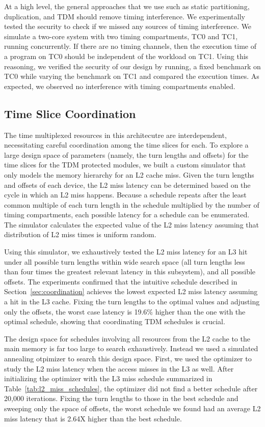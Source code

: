At a high level, the general approaches that we use such as static partitioning,
duplication, and TDM should remove timing interference. We experimentally
tested the security to check if we missed any sources of timing interference.
We simulate a two-core 
system with two timing compartments, TC0 and
TC1, running concurrently. 
If there are no timing channels, then the execution time of a program on 
TC0 should be independent of the workload on TC1.
Using this reasoning, we verified the
security of our design by running, a fixed benchmark
on TC0 while varying the benchmark on TC1 and compared the execution times. 
As expected, 
we observed no interference with timing compartments enabled.

\subsection{Time Slice Coordination}
\label{sec:eval_coord}

The time multiplexed resources in this architecutre are interdependent, 
necessitating careful coordination among the time slices for each.
To explore a large design space of parameters (namely, the turn lengths and 
offsets) for the time slices for the TDM 
protected modules, we built a custom simulator that only models the memory
hierarchy for an L2 cache miss.
Given the turn lengths and offsets of each device, the L2 miss latency can
be determined based on the cycle in which an L2 miss happens.
Because a schedule repeats after the least common multiple of each turn length in 
the schedule multiplied by the number of timing compartments, each possible 
latency for a schedule can be enumerated. The simulator calculates
the expected value of the L2 miss latency assuming that distribution of L2 miss 
times is uniform random.

Using this simulator, we exhaustively tested the L2 miss latency for an
L3 hit under all possible turn lengths within wide search space (all turn 
lengths less than four times the greatest relevant latency in this subsystem),
and all possible offsets. The experiments confirmed that 
the intuitive schedule described in 
Section~\ref{sec:coordination} achieves the lowest expected L2 miss latency
assuming a hit in the L3 cache.
Fixing the turn lengths to the optimal values and adjusting only the offsets,
the worst case latency is 19.6\% higher than the one with the optimal schedule, showing
that coordinating TDM schedules is crucial.

The design space for schedules involving all resources from the L2 cache to
the main memory is far too large to search exhaustively.
Instead we used a simulated annealing otpimizer to search this design space.
First, we used the optimizer to study the L2 miss latency when the access misses
in the L3 as well.
After initializing the optimizer with the L3 miss schedule summarized in 
Table~\ref{tab:l2_miss_schedules}, the optimizer did not find a better schedule 
after 20,000 iterations. Fixing the turn lengths to those in the best
schedule and sweeping only the space of offsets,
the worst schedule we found had an average L2 miss latency that is 2.64X higher than the 
best schedule.


